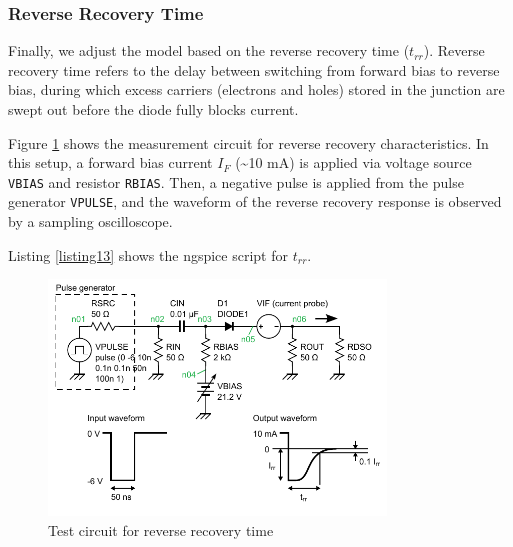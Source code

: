 \documentclass[a4paper,12pt,titlepage]{article}
\begin{document}
\pagebreak

\subsubsection{Reverse Recovery Time}

Finally, we adjust the model based on the reverse recovery time ($t_{rr}$). Reverse recovery time
refers to the delay between switching from forward bias to reverse bias, during which excess
carriers (electrons and holes) stored in the junction are swept out before the diode fully blocks
current.

Figure \ref{fig:img07} shows the measurement circuit for reverse recovery characteristics. In this
setup, a forward bias current $I_F$ (\sim 10 mA) is applied via voltage source \texttt{VBIAS} and
resistor \texttt{RBIAS}. Then, a negative pulse is applied from the pulse generator
\texttt{VPULSE}, and the waveform of the reverse recovery response is observed by a sampling
oscilloscope.

Listing \ref{listing13} shows the ngspice script for $t_{rr}$.

\begin{figure}[htbp]
    \centering
    \includegraphics[width=0.8\textwidth]{images/img07.pdf}
    \caption{Test circuit for reverse recovery time}
    \label{fig:img07}
\end{figure}
\end{document}
